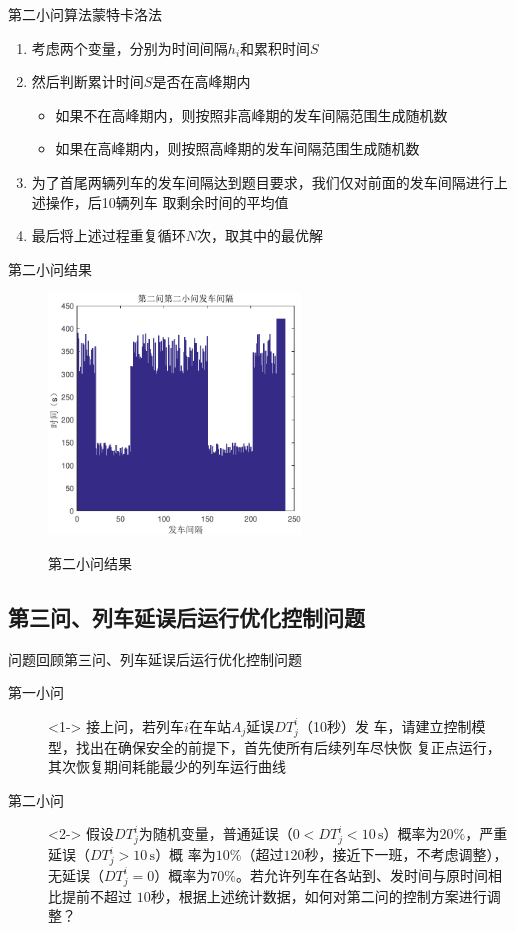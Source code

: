 \documentclass{beamer}
\begin{document}
\begin{frame}{第二小问算法}{蒙特卡洛法}
\begin{enumerate}
  \item<1-> 考虑两个变量，分别为时间间隔$h_i$和累积时间$S$
  \item<2-> 然后判断累计时间$S$是否在高峰期内
  \begin{itemize}
    \item<3-> 如果不在高峰期内，则按照非高峰期的发车间隔范围生成随机数
    \item<4-> 如果在高峰期内，则按照高峰期的发车间隔范围生成随机数
  \end{itemize}

  \item<5-> 为了首尾两辆列车的发车间隔达到题目要求，我们仅对前面的发车间隔进行上述操作，后10辆列车
  取剩余时间的平均值
  \item<6-> 最后将上述过程重复循环$N$次，取其中的最优解
\end{enumerate}
\end{frame}

\begin{frame}{第二小问结果}
\begin{figure}
  \centering
  \includegraphics[width=6.7cm]{fig/fig14/fig14.pdf}\\
  \caption{第二小问结果}
\end{figure}

\end{frame}

\subsection{第三问、列车延误后运行优化控制问题}
\begin{frame}{问题回顾}{第三问、列车延误后运行优化控制问题}
\begin{description}
  \item[第一小问]<1-> 接上问，若列车$i$在车站$A_j$延误$DT_j^i$（10秒）发
      车，请建立控制模型，找出在确保安全的前提下，首先使所有后续列车尽快恢
      复正点运行，其次恢复期间耗能最少的列车运行曲线
  \item[第二小问]<2-> 假设$DT_j^i$为随机变量，普通延误（$0<DT_j^i <10 \,
      \mathrm{s}$）概率为$20\%$，严重延误（$DT_j^i >10 \, \mathrm{s}$）概
      率为$10\%$（超过$120$秒，接近下一班，不考虑调整），无延误（$DT_j^i=
      0$）概率为$70\%$。若允许列车在各站到、发时间与原时间相比提前不超过
      $10$秒，根据上述统计数据，如何对第二问的控制方案进行调整？
\end{description}
\end{frame}
\end{document}
